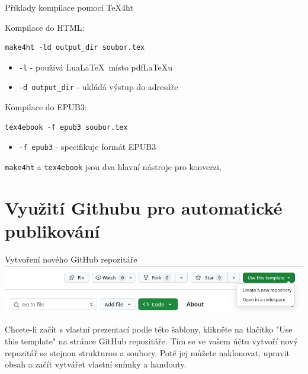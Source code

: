 \begin{frame}[fragile]{Příklady kompilace pomocí TeX4ht}

\begin{block}{Kompilace do HTML:}
\begin{verbatim}
make4ht -ld output_dir soubor.tex
\end{verbatim}
\end{block}



\begin{itemize}
    \item \texttt{-l} - používá Lua\LaTeX\ místo pdf\LaTeX u
    \item \texttt{-d output\_dir} - ukládá výstup do adresáře
\end{itemize}

\begin{block}{Kompilace do EPUB3:}
\begin{verbatim}
tex4ebook -f epub3 soubor.tex
\end{verbatim}
\end{block}

\begin{itemize}
    \item \texttt{-f epub3} - specifikuje formát EPUB3
\end{itemize}
\end{frame}

\texttt{make4ht} a \texttt{tex4ebook} jsou dva hlavní nástroje pro konverzi, 



\section{Využití Githubu pro automatické publikování}

\begin{frame}[fragile]{Vytvoření nového GitHub repozitáře}
\includegraphics[width=\textwidth]{img/template-use.png}
\end{frame}

Chcete-li začít s vlastní prezentací podle této šablony, klikněte na tlačítko
"Use this template" na stránce GitHub repozitáře. Tím se ve vašem účtu vytvoří
nový repozitář se stejnou strukturou a soubory. Poté jej můžete naklonovat,
upravit obsah a začít vytvářet vlastní snímky a handouty.


